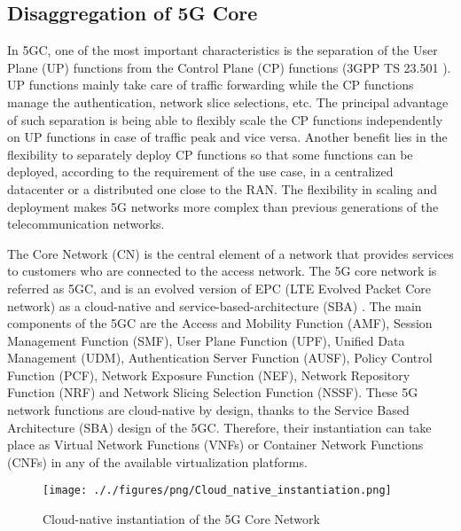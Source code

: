 

\subsection{Disaggregation of 5G Core}

In 5GC, one of the most important characteristics is the separation of the User Plane (UP) functions from the Control Plane (CP) functions (3GPP TS 23.501 \cite{ts-23501}). UP functions mainly take care of traffic forwarding while the CP functions manage the authentication, network slice selections, etc. The principal advantage of such separation is being able to flexibly scale the CP functions independently on UP functions in case of traffic peak and vice versa. Another benefit lies in the flexibility to separately deploy CP functions so that some functions can be deployed, according to the requirement of the use case, in a centralized datacenter or a distributed one close to the RAN. The flexibility in scaling and deployment makes 5G networks more complex than previous generations of the telecommunication networks.

The Core Network (CN) is the central element of a network that provides services to customers who are connected to the access network. The 5G core network is referred as 5GC, and is an evolved version of EPC (LTE Evolved Packet Core network) as a cloud-native and service-based-architecture (SBA) \cite{arouk20205g}. The main components of the 5GC are the Access and Mobility Function (AMF), Session Management Function (SMF), User Plane Function (UPF), Unified Data Management (UDM), Authentication Server Function (AUSF), Policy Control Function (PCF), Network Exposure Function (NEF), Network Repository Function (NRF) and Network Slicing Selection Function (NSSF). These 5G network functions are cloud-native by design, thanks to the Service Based Architecture (SBA) design of the 5GC. Therefore, their instantiation can take place as Virtual Network Functions (VNFs) or Container Network Functions (CNFs) in any of the available virtualization platforms.


\begin{figure*}[t]
    \centering
    \texttt{[image: ././figures/png/Cloud\_native\_instantiation.png]}
	\caption{Cloud-native instantiation of the 5G Core Network}
	\label{fig:Cloud-native-instantiation}
\end{figure*}

